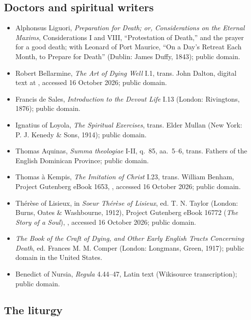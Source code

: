 \subsection*{Doctors and spiritual writers}

{\fontsize{8.6}{9.6}\selectfont
\begin{itemize}[itemsep=0pt,parsep=0pt,topsep=0.05em]
\item Alphonsus Liguori, \emph{Preparation for Death; or, Considerations on the Eternal Maxims}, Considerations I and VIII, ``Protestation of Death,'' and the prayer for a good death; with Leonard of Port Maurice, ``On a Day's Retreat Each Month, to Prepare for Death'' (Dublin: James Duffy, 1843); public domain.
\item Robert Bellarmine, \emph{The Art of Dying Well} I.1, trans. John Dalton, digital text at , accessed 16 October 2026; public domain.
\item Francis de Sales, \emph{Introduction to the Devout Life} I.13 (London: Rivingtons, 1876); public domain.
\item Ignatius of Loyola, \emph{The Spiritual Exercises}, trans. Elder Mullan (New York: P. J. Kenedy \& Sons, 1914); public domain.
\item Thomas Aquinas, \emph{Summa theologiae} I-II, q.~85, aa.~5--6, trans. Fathers of the English Dominican Province; public domain.
\item Thomas \`a Kempis, \emph{The Imitation of Christ} I.23, trans. William Benham, Project Gutenberg eBook 1653, , accessed 16 October 2026; public domain.
\item Th\'er\`ese of Lisieux, in \emph{Soeur Th\'er\`ese of Lisieux}, ed. T. N. Taylor (London: Burns, Oates \& Washbourne, 1912), Project Gutenberg eBook 16772 (\emph{The Story of a Soul}), , accessed 16 October 2026; public domain.
\item \emph{The Book of the Craft of Dying, and Other Early English Tracts Concerning Death}, ed. Frances M. M. Comper (London: Longmans, Green, 1917); public domain in the United States.
\item Benedict of Nursia, \emph{Regula} 4.44--47, Latin text (Wikisource transcription); public domain.
\end{itemize}}

\subsection*{The liturgy}

